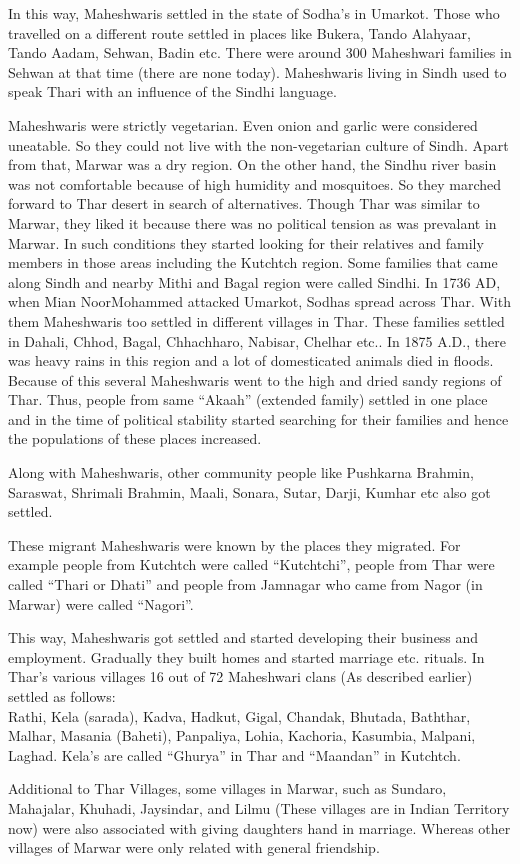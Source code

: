 In this way, Maheshwaris settled in the state of Sodha's in Umarkot. Those who travelled on a different route settled in places like Bukera, Tando Alahyaar, Tando Aadam, Sehwan, Badin etc. There were around 300 Maheshwari families in Sehwan at that time (there are none today). Maheshwaris living in Sindh used to speak Thari with an influence of the Sindhi language.

Maheshwaris were strictly vegetarian. Even onion and garlic were considered uneatable. So they could not live with the non-vegetarian culture of Sindh. Apart from that, Marwar was a dry region. On the other hand, the Sindhu river basin was not comfortable because of high humidity and mosquitoes. So they marched forward to Thar desert in search of alternatives. Though Thar was similar to Marwar, they liked it because there was no political tension as was prevalant in Marwar. In such conditions they started looking for their relatives and family members in those areas including the Kutchtch region. Some families that came along Sindh and nearby Mithi and Bagal region were called Sindhi. In 1736 AD, when Mian NoorMohammed attacked Umarkot, Sodhas spread across Thar. With them Maheshwaris too settled in different villages in Thar. These families settled in Dahali, Chhod, Bagal, Chhachharo, Nabisar, Chelhar etc.. In 1875 A.D., there was heavy rains in this region and a lot of domesticated animals died in floods. Because of this several Maheshwaris went to the high and dried sandy regions of Thar. Thus, people from same ``Akaah'' (extended family) settled in one place and in the time of political stability started searching for their families and hence the populations of these places increased.

Along with Maheshwaris, other community people like Pushkarna Brahmin, Saraswat, Shrimali Brahmin, Maali, Sonara, Sutar, Darji, Kumhar etc also got settled.

These migrant Maheshwaris were known by the places they migrated. For example people from Kutchtch were called ``Kutchtchi'', people from Thar were called ``Thari or Dhati'' and people from Jamnagar who came from Nagor (in Marwar) were called ``Nagori''.

This way, Maheshwaris got settled and started developing their business and employment. Gradually they built homes and started marriage etc. rituals. In Thar's various villages 16 out of 72 Maheshwari clans (As described earlier) settled as follows:\\
Rathi, Kela (sarada), Kadva, Hadkut, Gigal, Chandak, Bhutada, Baththar, Malhar, Masania (Baheti), Panpaliya, Lohia, Kachoria, Kasumbia, Malpani, Laghad. Kela's are called ``Ghurya'' in Thar and ``Maandan'' in Kutchtch.

Additional to Thar Villages, some villages in Marwar, such as Sundaro, Mahajalar, Khuhadi, Jaysindar, and Lilmu (These villages are in Indian Territory now) were also associated with giving daughters hand in marriage. Whereas other villages of Marwar were only related with general friendship.
